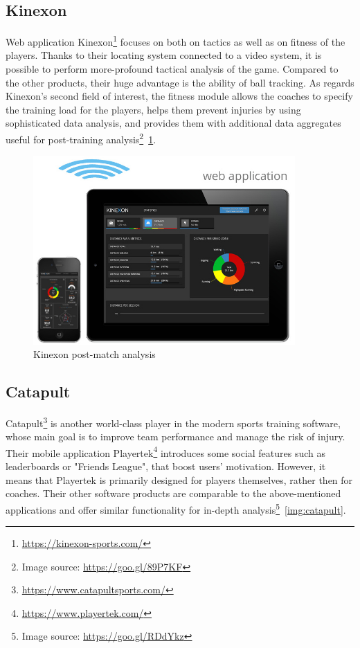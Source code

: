 \subsection{Kinexon}
Web application Kinexon\footnote{\url{https://kinexon-sports.com/}} focuses on both on tactics as well as on fitness of the players. Thanks to their locating system connected to a video system, it is possible to perform more-profound tactical analysis of the game. Compared to the other products, their huge advantage is the ability of ball tracking. As regards Kinexon’s second field of interest, the fitness module allows the coaches to specify the training load for the players, helps them prevent injuries by using sophisticated data analysis, and provides them with additional data aggregates useful for post-training analysis\footnote{Image source: \url{https://goo.gl/89P7KF}}~\ref{img:kinexon}. 

\begin{figure}[htb]
\begin{center}
  \includegraphics*[width=10cm,keepaspectratio]{images/kinexon}
\end{center}
\caption{Kinexon post-match analysis}
\label{img:kinexon}
\end{figure}

\subsection{Catapult}
Catapult\footnote{\url{https://www.catapultsports.com/}} is another world-class player in the modern sports training software, whose main goal is to improve team performance and manage the risk of injury. Their mobile application Playertek\footnote{\url{https://www.playertek.com/}} introduces some social features such as leaderboards or "Friends League", that boost users’ motivation. However, it means that Playertek is primarily designed for players themselves, rather then for coaches. Their other software products are comparable to the above-mentioned applications and offer similar functionality for in-depth analysis\footnote{Image source: \url{https://goo.gl/RDdYkz}}~\ref{img:catapult}.

